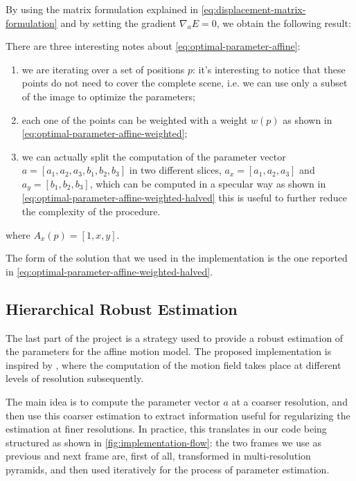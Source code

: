 By using the matrix formulation explained in \cref{eq:displacement-matrix-formulation} and by setting the gradient $\nabla_a E = 0$, we obtain the following result:

There are three interesting notes about \cref{eq:optimal-parameter-affine}:
\begin{enumerate}
    \item we are iterating over a set of positions $p$: it's interesting to notice that these points do not need to cover the complete scene, i.e. we can use only a subset of the image to optimize the parameters;
    \item each one of the points can be weighted with a weight $w(p)$ as shown in \cref{eq:optimal-parameter-affine-weighted};
    \item we can actually split the computation of the parameter vector $a = [a_1, a_2, a_3, b_1, b_2, b_3]$ in two different slices, $a_x = [a_1, a_2, a_3]$ and $a_y = [b_1, b_2, b_3]$, which can be computed in a specular way as shown in \cref{eq:optimal-parameter-affine-weighted-halved} this is useful to further reduce the complexity of the procedure.
\end{enumerate} 



where $A_x(p) = [1,x,y]$.

The form of the solution that we used in the implementation is the one reported in \cref{eq:optimal-parameter-affine-weighted-halved}.

\subsection{Hierarchical Robust Estimation}

The last part of the project is a strategy used to provide a robust estimation of the parameters for the affine motion model.
The proposed implementation is inspired by \cite{Dufeaux2000}, where the computation of the motion field takes place at different levels of resolution subsequently.

The main idea is to compute the parameter vector $a$ at a coarser resolution, and then use this coarser estimation to extract information useful for regularizing the estimation at finer resolutions. 
In practice, this translates in our code being structured as shown in \cref{fig:implementation-flow}: the two frames we use as previous and next frame are, first of all, transformed in multi-resolution pyramids, and then used iteratively for the process of parameter estimation.


